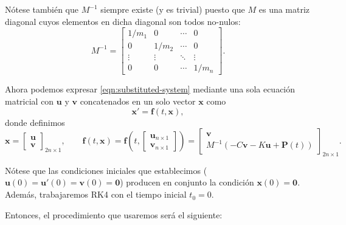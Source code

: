Nótese también que \(M^{-1}\) siempre existe (y es trivial) puesto que \(M\) es una matriz diagonal cuyos elementos en dicha diagonal son todos no-nulos:
\[
    M^{-1} = \begin{bmatrix}
        1/m_1 & 0 & \cdots & 0 \\
        0 & 1/m_2 & \cdots & 0 \\
        \vdots & \vdots & \ddots & \vdots \\
        0 & 0 & \cdots & 1/m_n
    \end{bmatrix}
.\]

Ahora podemos expresar \eqref{eqn:substituted-system} mediante una sola ecuación matricial con \(\mathbf{u}\) y \(\mathbf{v}\) concatenados en un solo vector \(\mathbf{x}\) como
\[
    \mathbf{x}' = \mathbf{f}(t, \mathbf{x})
,\]
donde definimos
\[
    \mathbf{x} = \begin{bmatrix} \mathbf{u} \\ \mathbf{v} \end{bmatrix}_{2n \times 1},
    \qquad
    \mathbf{f}(t, \mathbf{x}) = \mathbf{f}\left(t, \begin{bmatrix} \mathbf{u}_{n \times 1} \\ \mathbf{v}_{n \times 1} \end{bmatrix}\right) = \begin{bmatrix}
        \mathbf{v} \\
        M^{-1}(-C\mathbf{v} - K\mathbf{u} + \mathbf{P}(t))
    \end{bmatrix}_{2n \times 1}
.\]

Nótese que las condiciones iniciales que establecimos (\(\mathbf{u}(0) = \mathbf{u}'(0) = \mathbf{v}(0) = \mathbf{0}\)) producen en conjunto la condición \(\mathbf{x}(0) = \mathbf{0}\). Además, trabajaremos RK4 con el tiempo inicial \(t_0 = 0\).

Entonces, el procedimiento que usaremos será el siguiente:

